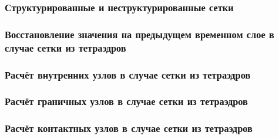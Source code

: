 \subsubsection{Структурированные и неструктурированные сетки}


\subsubsection{Восстановление значения на предыдущем временном слое в случае сетки из тетраэдров}


\subsubsection{Расчёт внутренних узлов в случае сетки из тетраэдров}



\subsubsection{Расчёт граничных узлов в случае сетки из тетраэдров}


\subsubsection{Расчёт контактных узлов в случае сетки из тетраэдров}


